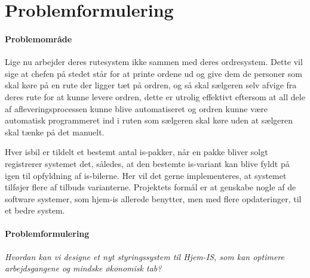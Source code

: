 \chapter{Problemformulering}\label{ch:problemformulering}

\subsubsection{Problemområde}

Lige nu arbejder deres rutesystem ikke sammen med deres ordresystem. Dette vil sige at chefen på stedet står for at printe ordene ud og give dem de personer som skal køre på en rute der ligger tæt på ordren, og så skal sælgeren selv afvige fra deres rute for at kunne levere ordren, dette er utrolig effektivt eftersom at all dele af afleveringsprocessen kunne blive automatiseret og ordren kunne være automatisk programmeret ind i ruten som sælgeren skal køre uden at sælgeren skal tænke på det manuelt. 

Hver isbil er tildelt et bestemt antal is-pakker, når en pakke bliver solgt registrerer systemet det, således, at den bestemte is-variant kan blive fyldt på igen til opfyldning af is-bilerne. Her vil det gerne implementeres, at systemet tilføjer flere af tilbuds varianterne.
Projektets formål er at genskabe nogle af de software systemer, som hjem-is allerede benytter, men med flere opdateringer, til et bedre system. 

\subsubsection{Problemformulering}
 \textit{Hvordan kan vi designe et nyt styringssystem til Hjem-IS, som kan optimere arbejdsgangene og mindske økonomisk tab?}